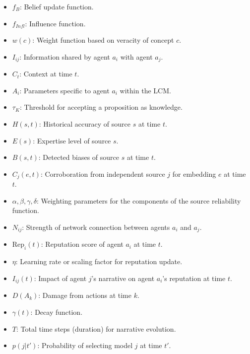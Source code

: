 \documentclass[12pt, a4paper]{article}
\begin{document}
\begin{itemize}
    \item \( f_B \): Belief update function.
    \item \( f_{Infl} \): Influence function.
    \item \( w(c) \): Weight function based on veracity of concept \( c \).
    \item \( I_{ij} \): Information shared by agent \( a_i \) with agent \( a_j \).
    \item \( C_t \): Context at time \( t \).
    \item \( A_i \): Parameters specific to agent \( a_i \) within the LCM.
    \item \( \tau_K \): Threshold for accepting a proposition as knowledge.
    \item \( H(s,t) \): Historical accuracy of source \(s\) at time \(t\).
    \item \( E(s) \): Expertise level of source \(s\).
    \item \( B(s,t) \): Detected biases of source \(s\) at time \(t\).
    \item \( C_j(e,t) \): Corroboration from independent source \(j\) for embedding \(e\) at time \(t\).
    \item \( \alpha, \beta, \gamma, \delta \): Weighting parameters for the components of the source reliability function.
    \item \( N_{ij} \): Strength of network connection between agents \( a_i \) and \( a_j \).
    \item \( \text{Rep}_i(t) \): Reputation score of agent \( a_i \) at time \( t \).
    \item \( \eta \): Learning rate or scaling factor for reputation update.
    \item \( I_{ij}(t) \): Impact of agent \( j \)'s narrative on agent \( a_i \)'s reputation at time \( t \).
    \item \( D(A_k) \): Damage from actions at time \( k \).
    \item \( \gamma(t) \): Decay function.
    \item \( T \):  Total time steps (duration) for narrative evolution.
    \item \( p(j|t') \): Probability of selecting model \( j \) at time \( t' \).
  



\end{itemize}
\end{document}
